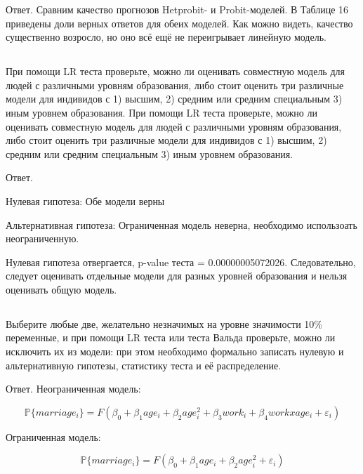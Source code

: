 \documentclass[a4paper,12pt]{article}
\def \e{\varepsilon}
\def \mbb{\mathbb}
\def \P{\mbb{P}}
\def \e{\varepsilon}
\begin{document}
Ответ. Сравним качество прогнозов Hetprobit- и Probit-моделей. В Таблице 16 приведены доли верных ответов для обеих моделей. Как можно видеть, качество существенно возросло, но оно всё ещё не переигрывает линейную модель. 

\subsection{}
\subsection{}
\subsection{}
\Sun При помощи LR теста проверьте, можно ли оценивать совместную модель для
людей с различными уровням образования, либо стоит оценить три различные модели для
индивидов с 1) высшим, 2) средним или средним специальным 3) иным уровнем
образования. При помощи LR теста проверьте, можно ли оценивать совместную модель для
людей с различными уровням образования, либо стоит оценить три различные модели для
индивидов с 1) высшим, 2) средним или средним специальным 3) иным уровнем
образования.

Ответ.

Нулевая гипотеза: Обе модели верны

Альтернативная гипотеза: Ограниченная модель неверна, необходимо использоать неограниченную.

Нулевая гипотеза отвергается, p-value теста = 0.00000005072026. Следовательно, следует оценивать отдельные модели для разных уровней образования и нельзя оценивать общую модель.
	

\subsection{}
\Sun Выберите любые две, желательно незначимых на уровне значимости 10\%
переменные, и при помощи LR теста или теста Вальда проверьте, можно ли исключить их
из модели: при этом необходимо формально записать нулевую и альтернативную
гипотезы, статистику теста и её распределение.


Ответ. 
Неограниченная модель:

\[ \P\{ marriage_i  \} = F(\beta_0 + \beta_1 age_i + \beta_2 age_i^2 + \beta_3 work_i + \beta_4 workxage_i + \e_i) \]

Ограниченная модель:

\[ \P\{ marriage_i  \} = F(\beta_0 + \beta_1 age_i + \beta_2 age_i^2 + \e_i) \]
\end{document}
